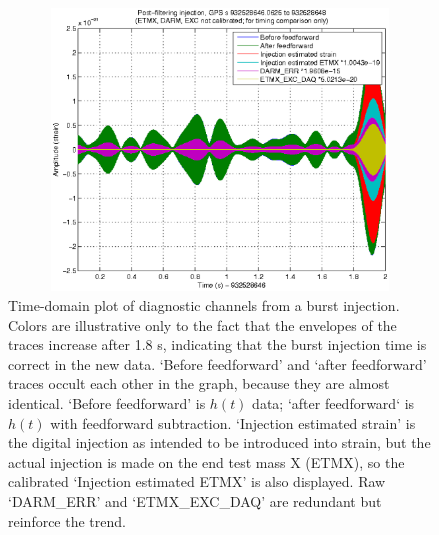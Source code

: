\begin{figure}
\begin{center}
\includegraphics[height=75mm, width=150mm]{figure7.eps}
\caption{Time-domain plot of diagnostic channels from a burst injection. Colors are illustrative only to the fact that the envelopes of the traces increase after 1.8 s, indicating that the burst injection time is correct in the new data. `Before feedforward' and `after feedforward' traces occult each other in the graph, because they are almost identical. `Before feedforward' is $h(t)$ data; `after feedforward` is $h(t)$ with feedforward subtraction. `Injection estimated strain' is the digital injection as intended to be introduced into strain, but the actual injection is made on the end test mass X (ETMX), so the calibrated `Injection estimated ETMX' is also displayed. Raw `DARM\_ERR' and `ETMX\_EXC\_DAQ' are redundant but reinforce the trend.}
\label{timeDomainInjection}
\end{center}
\end{figure}

